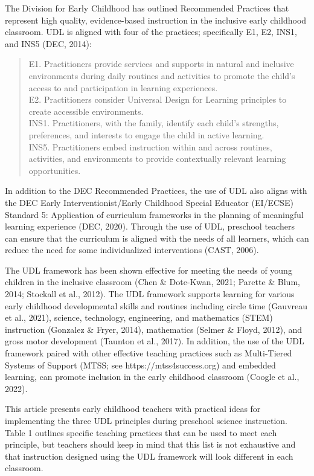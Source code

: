 \documentclass[11.5pt]{sig-alternate}
\begin{document}
\begin{large}
The Division for Early Childhood has outlined Recommended Practices that represent high quality, evidence-based instruction in the inclusive early childhood classroom. UDL is aligned with four of the practices; specifically E1, E2, INS1, and INS5 (DEC, 2014):
\begin{quote} E1. Practitioners provide services and supports in natural and inclusive environments
during daily routines and activities to promote the child’s access to and
participation in learning experiences.
    \\E2. Practitioners consider Universal Design for Learning principles to create accessible
    environments.
    \\INS1. Practitioners, with the family, identify each child's strengths, preferences, and
    interests to engage the child in active learning.
    \\ INS5. Practitioners embed instruction within and across routines, activities, and
    environments to provide contextually relevant learning opportunities.\end{quote} 

In addition to the DEC Recommended Practices, the use of UDL also aligns with the DEC Early Interventionist/Early Childhood Special Educator (EI/ECSE) Standard 5: Application of curriculum frameworks in the planning of meaningful learning experience (DEC, 2020). Through the use of UDL, preschool teachers can ensure that the curriculum is aligned with the needs of all learners, which can reduce the need for some individualized interventions (CAST, 2006).

The UDL framework has been shown effective for meeting the needs of young children in the inclusive classroom (Chen \& Dote-Kwan, 2021; Parette \& Blum, 2014; Stockall et al., 2012). The UDL framework supports learning for various early childhood developmental skills and routines including circle time (Gauvreau et al., 2021), science, technology, engineering, and mathematics (STEM) instruction (Gonzalez \& Fryer, 2014), mathematics (Selmer \& Floyd, 2012), and gross motor development (Taunton et al., 2017). In addition, the use of the UDL framework paired with other effective teaching practices such as Multi-Tiered Systems of Support (MTSS; see https://mtss4success.org) and embedded learning, can promote inclusion in the early childhood classroom (Coogle et al., 2022).

This article presents early childhood teachers with practical ideas for implementing the three UDL principles during preschool science instruction. Table 1 outlines specific teaching practices that can be used to meet each principle, but teachers should keep in mind that this list is not exhaustive and that instruction designed using the UDL framework will look different in each classroom.


\end{large}
\end{document}
